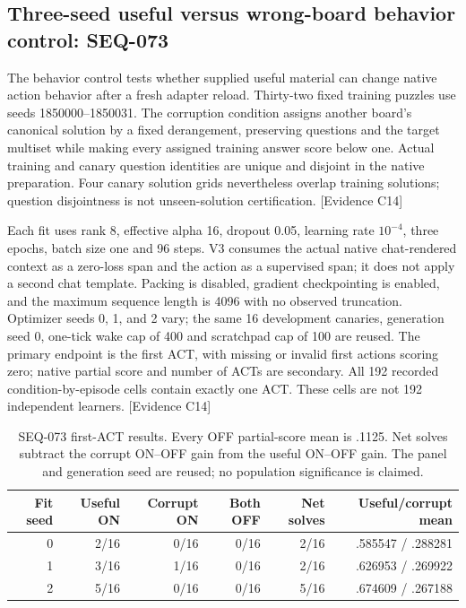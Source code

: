 \documentclass[11pt]{article}
\newcommand{\ev}[1]{\textsf{[Evidence #1]}}
\begin{document}
\subsection{Three-seed useful versus wrong-board behavior control: SEQ-073}
The behavior control tests whether supplied useful material can change native
action behavior after a fresh adapter reload. Thirty-two fixed training puzzles
use seeds 1850000--1850031. The corruption condition assigns another board's
canonical solution by a fixed derangement, preserving questions and the target
multiset while making every assigned training answer score below one. Actual
training and canary question identities are unique and disjoint in the native
preparation. Four canary solution grids nevertheless overlap training solutions;
question disjointness is not unseen-solution certification. \ev{C14}

Each fit uses rank 8, effective alpha 16, dropout 0.05, learning rate $10^{-4}$,
three epochs, batch size one and 96 steps. V3 consumes the actual native
chat-rendered context as a zero-loss span and the action as a supervised span;
it does not apply a second chat template. Packing is disabled, gradient
checkpointing is enabled, and the maximum sequence length is 4096 with no
observed truncation. Optimizer seeds 0, 1, and 2 vary; the same 16 development
canaries, generation seed 0, one-tick wake cap of 400 and scratchpad cap of 100
are reused. The primary endpoint is the first ACT, with missing or invalid
first actions scoring zero; native partial score and number of ACTs are
secondary. All 192 recorded condition-by-episode cells contain exactly one
ACT. These cells are not 192 independent learners. \ev{C14}

\begin{table}[htbp]
\centering\small
\begin{tabular}{rrrrrr}
\toprule
Fit seed & Useful ON & Corrupt ON & Both OFF & Net solves & Useful/corrupt mean \\
\midrule
0 & 2/16 & 0/16 & 0/16 & 2/16 & .585547 / .288281 \\
1 & 3/16 & 1/16 & 0/16 & 2/16 & .626953 / .269922 \\
2 & 5/16 & 0/16 & 0/16 & 5/16 & .674609 / .267188 \\
\bottomrule
\end{tabular}
\caption{SEQ-073 first-ACT results. Every OFF partial-score mean is .1125.
Net solves subtract the corrupt ON--OFF gain from the useful ON--OFF gain.
The panel and generation seed are reused; no population significance is claimed.}
\label{tab:behavior}
\end{table}
\end{document}
